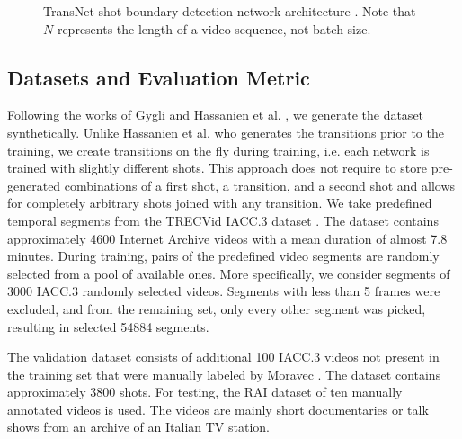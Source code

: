 \begin{figure}[t]
    \caption[TransNet shot boundary detection network architecture]{TransNet shot boundary detection network architecture \cite{soucek2019transnet}. Note that $N$ represents the length of a video sequence, not batch size.}
    \label{fig:nn_architecture}
\end{figure}


\subsection{Datasets and Evaluation Metric}\label{sec:transnetV1Eval}

Following the works of Gygli \cite{Gygli18} and Hassanien et al. \cite{Hassanien17}, we generate the dataset synthetically. Unlike Hassanien et al. who generates the transitions prior to the training, we create transitions on the fly during training, i.e. each network is trained with slightly different shots. This approach does not require to store pre-generated combinations of a first shot, a transition, and a second shot and allows for completely arbitrary shots joined with any transition. We take predefined temporal segments from the TRECVid IACC.3 dataset \cite{2017trecvidawad}. The dataset contains approximately 4600 Internet Archive videos with a mean duration of almost 7.8 minutes. During training, pairs of the predefined video segments are randomly selected from a pool of available ones. More specifically, we consider segments of 3000 IACC.3 randomly selected videos. Segments with less than 5 frames were excluded, and from the remaining set, only every other segment was picked, resulting in selected 54884 segments.

The validation dataset consists of additional 100 IACC.3 videos not present in the training set that were manually labeled by Moravec \cite{soucek2019transnet}. The dataset contains approximately 3800 shots. For testing, the RAI dataset \cite{Baraldi15} of ten manually annotated videos is used. The videos are mainly short documentaries or talk shows from an archive of an Italian TV station.

